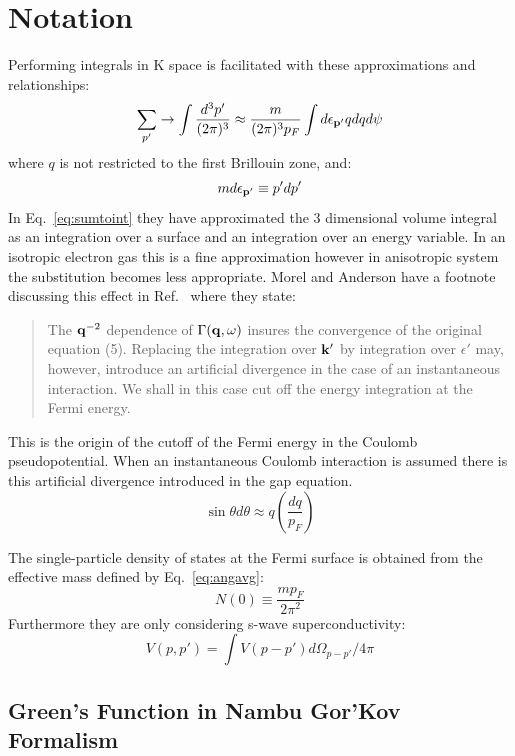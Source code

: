 \documentclass{article}
\def\k{{\bf k}}
\def\q{{\bf q}}
\def\p{{\bf p}}
\begin{document}
\section{Notation}
%
Performing integrals in K space is facilitated with these approximations
and relationships:
%
\begin{equation}
\label{eq:sumtoint}
\sum_{p'} \rightarrow \int \frac{d^{3}p'}{(2\pi)^{3}} 
\approx \frac{m}{(2\pi)^{3}p_{F}}\int d\epsilon_{\p'}q dq d\psi
\end{equation}
%
%
where $q$ is not restricted to the first Brillouin zone, and:
\begin{equation}
m d\epsilon_{\p'} \equiv p'dp'
\end{equation}
%
In Eq.~\ref{eq:sumtoint} they have approximated the 3 dimensional
volume integral as an integration over a surface and an integration
over an energy variable. In an isotropic electron gas this is a fine
approximation however in anisotropic system the substitution becomes
less appropriate.
Morel and Anderson have a footnote discussing this effect in Ref.~\cite{morel62}
where they state:
\begin{quote}
The $\q^{-2}$ dependence of $\Gamma(\q,\omega)$ insures the convergence of the original equation (5).
Replacing the integration over $\k'$ by integration over $\epsilon'$ may, however, introduce an artificial divergence
in the case of an instantaneous interaction. We shall in this case cut off
the energy integration at the Fermi energy.
\end{quote}
%
This is the origin of the cutoff of the Fermi 
energy in the Coulomb pseudopotential. When an 
instantaneous Coulomb interaction is assumed there 
is this artificial divergence introduced in 
the gap equation.
%
\begin{equation}
\label{eq:angavg}
\sin\theta d\theta \approx q(\frac{dq}{p_{F}})
\end{equation}

The single-particle density of states at the Fermi
surface is obtained from the effective mass defined by
Eq.~\ref{eq:angavg}:
%
\begin{equation}
N(0) \equiv \frac{m p_{F}}{2\pi^{2}}
\end{equation}
%
Furthermore they are only considering s-wave superconductivity:
%
\begin{equation}
V(p,p') = \int V(p-p')d\Omega_{p-p'}/4\pi
\end{equation}
%
\subsection{Green's Function in Nambu Gor'Kov Formalism}
\end{document}
